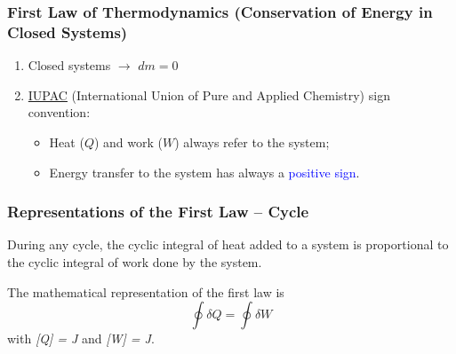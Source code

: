 \documentclass[10pt,compress,handout,ignorenonframetext]{beamer}
\begin{document}
\begin{frame}
 \frametitle{First Law of Thermodynamics (Conservation of Energy in Closed Systems)}
   \begin{enumerate} 
      \item<1-> Closed systems $\longrightarrow$ $dm = 0$
      \item<2-> \href{http://www.iupac.org/}{IUPAC} (International Union of Pure and Applied Chemistry) sign convention:
         \begin{itemize}
            \item<2-> Heat ($Q$) and work ($W$)  always refer to the system;
            \item<2-> Energy transfer to the system has always a \textcolor{blue}{positive sign}.
         \end{itemize}
   \end{enumerate}
\normalsize
\end{frame}


\begin{frame}
 \frametitle{Representations of the First Law -- Cycle}

 \begin{block}{}During any cycle, the cyclic integral of heat added to a system is proportional to the cyclic integral of work done by the system.\end{block}

 The mathematical representation of the first law is
 \begin{equation}
  \displaystyle\oint \delta Q = \displaystyle\oint \delta W
  \label{Module00:first_law}
 \end{equation}
 with {\it [Q] = J} and {\it [W] = J}.

\end{frame}
\end{document}
